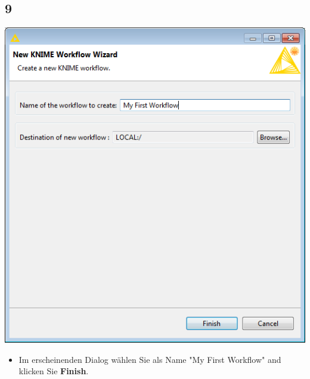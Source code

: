 \documentclass{beamer}
\begin{document}
\subsection{9}
\begin{frame}
	\begin{center}
  		\includegraphics[height=0.6\textheight]{9.png}
	\end{center}
	\begin{itemize}
		\item Im erscheinenden Dialog wählen Sie als Name "My First Workflow" and klicken Sie \textbf{Finish}.		
	\end{itemize}
\end{frame}
\end{document}
